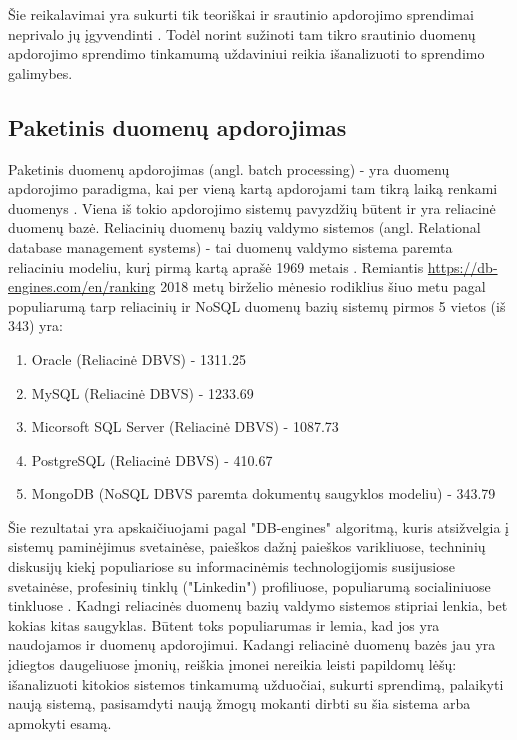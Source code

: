 \documentclass{VUMIFPSkursinis}
\begin{document}
    Šie reikalavimai yra sukurti tik teoriškai ir srautinio apdorojimo sprendimai neprivalo jų įgyvendinti \cite{stonebraker20058}. 
    Todėl norint sužinoti tam tikro srautinio duomenų apdorojimo sprendimo tinkamumą uždaviniui reikia išanalizuoti to sprendimo galimybes.                 
\subsection{Paketinis duomenų apdorojimas}
    Paketinis duomenų apdorojimas (angl. batch processing) - yra duomenų apdorojimo paradigma, kai per vieną kartą apdorojami tam tikrą laiką renkami duomenys \cite{batch}.
    Viena iš tokio apdorojimo sistemų pavyzdžių būtent ir yra reliacinė duomenų bazė. Reliacinių duomenų bazių valdymo sistemos (angl. Relational database management systems) - tai 
    duomenų valdymo sistema paremta reliaciniu modeliu, kurį pirmą kartą aprašė 1969 metais \cite{codd1969derivability}.
    Remiantis \url{https://db-engines.com/en/ranking} 2018 metų birželio mėnesio rodiklius šiuo metu pagal populiarumą tarp reliacinių ir NoSQL duomenų bazių sistemų pirmos 5 vietos (iš 343) yra:
    \begin{enumerate}
        \item Oracle (Reliacinė DBVS) - 1311.25
        \item MySQL (Reliacinė DBVS) - 1233.69
        \item Micorsoft SQL Server (Reliacinė DBVS) - 1087.73
        \item PostgreSQL (Reliacinė DBVS) - 410.67
        \item MongoDB (NoSQL DBVS paremta dokumentų saugyklos modeliu) - 343.79
    \end{enumerate}\par
        Šie rezultatai yra apskaičiuojami pagal "DB-engines" algoritmą, kuris atsižvelgia į sistemų paminėjimus svetainėse, paieškos dažnį paieškos varikliuose, techninių diskusijų kiekį
       populiariose su informacinėmis technologijomis susijusiose svetainėse, profesinių tinklų ("Linkedin") profiliuose, populiarumą socialiniuose tinkluose \cite{dbengines}. Kadngi reliacinės
    duomenų bazių valdymo sistemos stipriai lenkia, bet kokias kitas saugyklas. Būtent toks populiarumas ir lemia, kad jos yra naudojamos ir duomenų apdorojimui. Kadangi reliacinė
    duomenų bazės jau yra įdiegtos daugeliuose įmonių, reiškia įmonei nereikia leisti papildomų lėšų: išanalizuoti kitokios sistemos tinkamumą užduočiai, sukurti sprendimą, palaikyti naują sistemą, 
    pasisamdyti naują žmogų mokanti dirbti su šia sistema arba apmokyti esamą. \par
\end{document}
